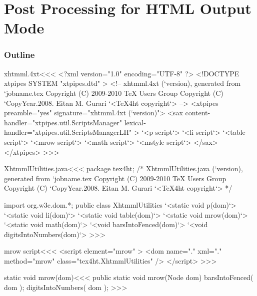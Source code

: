 \documentclass{article}
\begin{document}



\part{Post Processing for HTML Output Mode}


\section{Outline}



\<xhtmml.4xt\><<<
<?xml version="1.0" encoding="UTF-8" ?>
<!DOCTYPE xtpipes SYSTEM "xtpipes.dtd" >
<!-- xhtmml.4xt (`version), generated from `jobname.tex
     Copyright (C) 2009-2010 TeX Users Group
     Copyright (C) `CopyYear.2008. Eitan M. Gurari
`<TeX4ht copyright`> -->
<xtpipes preamble="yes" signature="xhtmml.4xt (`version)">
   <sax content-handler="xtpipes.util.ScriptsManager" 
        lexical-handler="xtpipes.util.ScriptsManagerLH" >
     `<p script`>
     `<li script`>
     `<table script`>
     `<mrow script`>
     `<math script`>
     `<mstyle script`>
   </sax>
</xtpipes>
>>>


% 


\<XhtmmlUtilities.java\><<<
package tex4ht;
/* XhtmmlUtilities.java (`version), generated from `jobname.tex
   Copyright (C) 2009-2010 TeX Users Group
   Copyright (C) `CopyYear.2008. Eitan M. Gurari
`<TeX4ht copyright`> */

import org.w3c.dom.*;
public class XhtmmlUtilities {
  `<static void p(dom)`>
  `<static void li(dom)`>
  `<static void table(dom)`>
  `<static void mrow(dom)`>
  `<static void math(dom)`>
  `<void barsIntoFenced(dom)`>
  `<void digitsIntoNumbers(dom)`>
}
>>>





\<mrow script\><<<
<script element="mrow" >
   <dom name="." xml="." method="mrow" class="tex4ht.XhtmmlUtilities" />
</script> 
>>>




\<static void mrow(dom)\><<<
public static void mrow(Node dom) {
   barsIntoFenced( dom );
   digitsIntoNumbers( dom );
}
>>>
\end{document}
